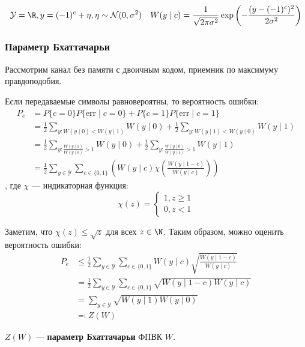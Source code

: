 \begin{example}
    \[\mathcal{Y} = \R, y = ( - 1)^c + \eta, \eta \sim \mathcal{N}(0, \sigma^2) \quad W(y \mid c) = \frac{1}{\sqrt{2\pi\sigma^2}}\exp\left( - \frac{(y - ( - 1)^c)^2}{2\sigma^2}\right)\]
\end{example}

\subsubsection{Параметр Бхаттачарьи}

Рассмотрим канал без памяти с двоичным кодом, приемник по максимуму правдоподобия.

Если передаваемые символы равновероятны, то вероятность ошибки:
\begin{align*}
    P_e
     & = P \{c = 0\} P \{\mathrm{err} \mid c = 0\} + P \{c = 1\} P \{\mathrm{err} \mid c = 1\} \\
     & = \frac{1}{2} \sum_{y : W(y \mid 0) < W(y \mid 1)} W(y \mid 0) + \frac{1}{2} \sum_{y : W(y \mid 1) < W(y \mid 0)} W(y \mid 1) \\
     & = \frac{1}{2} \sum_{y : \frac{W(y \mid 1)}{W(y \mid 0)} > 1} W(y \mid 0) + \frac{1}{2} \sum_{y : \frac{W(y \mid 0)}{W(y \mid 1)} > 1} W(y \mid 1) \\
     & = \frac{1}{2} \sum_{y \in \mathcal{Y}} \sum_{c \in \{0, 1\}} \left(W(y \mid c) \chi\left(\frac{W(y \mid 1 - c)}{W(y \mid c)}\right)\right)
\end{align*}
, где \(\chi\) --- индикаторная функция:
\[\chi(z) = \begin{cases}
    1, z \geq 1 \\
    0, z < 1
\end{cases}\]

Заметим, что \(\chi(z) \leq \sqrt{z}\) для всех \(z \in \N\).
Таким образом, можно оценить вероятность ошибки:
\begin{align*}
    P_e
     & \leq \frac{1}{2} \sum_{y \in \mathcal{Y}} \sum_{c \in \{0, 1\}} W(y \mid c) \sqrt{\frac{W(y \mid 1 - c)}{W(y \mid c)}} \\
     & = \frac{1}{2} \sum_{y \in \mathcal{Y}} \sum_{c \in \{0, 1\}} \sqrt{W(y \mid 1 - c)W(y \mid c)} \\
     & = \sum_{y \in \mathcal{Y}} \sqrt{W(y \mid 1)W(y \mid 0)} \\
     & \eqqcolon Z(W)
\end{align*}

\begin{definition}
    \(Z(W)\) --- \textbf{параметр Бхаттачарьи} ФПВК \(W\).
\end{definition}

